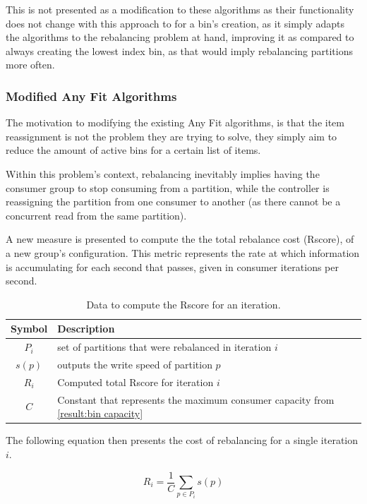 This is not presented as a modification to these algorithms as their
functionality does not change with this approach to for a bin's creation, as it
simply adapts the algorithms to the rebalancing problem at hand, improving it as
compared to always creating the lowest index bin, as that would imply
rebalancing partitions more often.

\subsubsection{Modified Any Fit Algorithms}
\label{subsub:modified_any_fit}

The motivation to modifying the existing Any Fit algorithms, is that the item
reassignment is not the problem they are trying to solve, they simply aim to
reduce the amount of active bins for a certain list of items. 

Within this problem's context, rebalancing inevitably implies having the
consumer group to stop consuming from a partition, while the controller is
reassigning the partition from one consumer to another (as there cannot be a
concurrent read from the same partition).

A new measure is presented to compute the the total rebalance cost (Rscore), of
a new group's configuration. This metric represents the rate at which
information is accumulating for each second that passes, given in consumer
iterations per second.

\begin{table}[H] \centering \caption{Data to compute the Rscore for an
    iteration.} \begin{tabular}{ |c|l| } \hline \textbf{Symbol} &
        \textbf{Description} \\ \hline $P_i$ & set of partitions that were
        rebalanced in iteration $i$ \\ $s(p)$ & outputs the write speed of
        partition $p$ \\ $R_i$  & Computed total Rscore for iteration $i$ \\ $C$
    &  Constant that represents the maximum consumer capacity from
    \ref{result:bin capacity}\\ \hline \end{tabular} \end{table}

The following equation then presents the cost of rebalancing for a single
    iteration $i$.

\begin{equation} R_i = \frac{1}{C}\sum_{p \in P_i} s(p) \end{equation}

